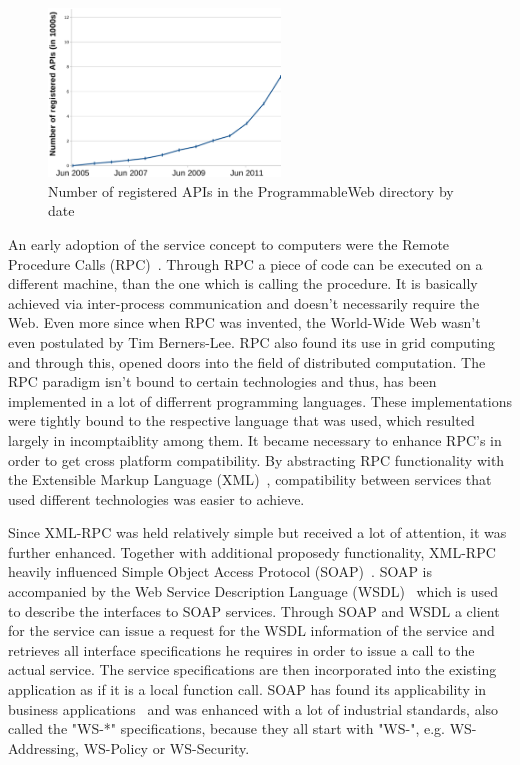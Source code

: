 \begin{figure}[!ht]
  \centering
  \includegraphics[width=0.55\textwidth]{figures/NumOfAPIs}
  \caption{Number of registered APIs in the ProgrammableWeb directory by date}
  \label{fig:NumOfAPIs}
\end{figure}

An early adoption of the service concept to computers were the Remote Procedure Calls (\textrm{RPC})~\cite{Birrell:1984:IRP:2080.357392}.
Through \textrm{RPC} a piece of code can be executed on a different machine, than the one which is calling the procedure.
It is basically achieved via inter-process communication and doesn't necessarily require the Web.
Even more since when \textrm{RPC} was invented, the \textrm{World-Wide Web} wasn't even postulated by Tim Berners-Lee. 
\textrm{RPC} also found its use in grid computing~\cite{seymour2002overview} and through this, opened doors into the field of distributed computation.
The \textrm{RPC} paradigm isn't bound to certain technologies and thus, has been implemented in a lot of differrent programming languages.
These implementations were tightly bound to the respective language that was used, which resulted largely in incomptaiblity among them.
It became necessary to enhance \textrm{RPC}'s in order to get cross platform compatibility.
By abstracting \textrm{RPC} functionality with the Extensible Markup Language (\textrm{XML})~\cite{bray1998extensible}, compatibility between services that used different technologies was easier to achieve.

Since \textrm{XML-RPC} was held relatively simple but received a lot of attention, it was further enhanced.
Together with additional proposedy functionality, XML-RPC heavily influenced Simple Object Access Protocol (\textrm{SOAP})~\cite{box2000simple}.
\textrm{SOAP} is accompanied by the Web Service Description Language (\textrm{WSDL})~\cite{christensen2001web} which is used to describe the interfaces to SOAP services.
Through \textrm{SOAP} and \textrm{WSDL} a client for the service can issue a request for the \textrm{WSDL} information of the service and retrieves all interface specifications he requires in order to issue a call to the actual service.
The service specifications are then incorporated into the existing application as if it is a local function call.
\textrm{SOAP} has found its applicability in business applications~\cite{journals/itpro/BarrosD06} and was enhanced with a lot of industrial standards, also called the "WS-*" specifications, because they all start with "WS-", e.g. WS-Addressing, WS-Policy or WS-Security.

